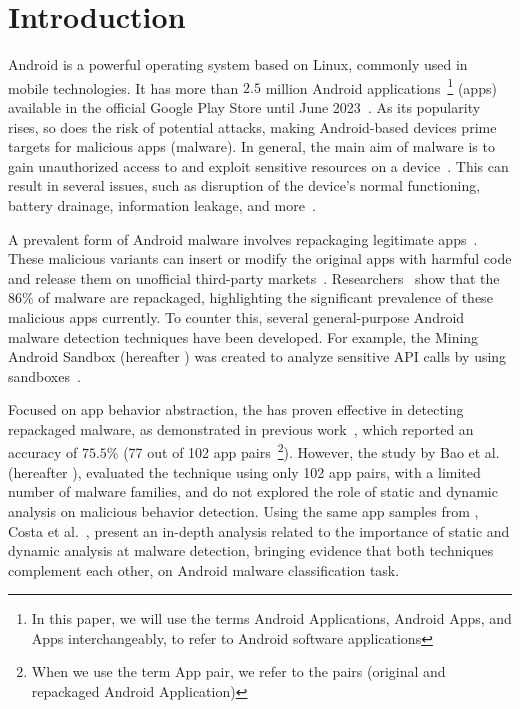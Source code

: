 \section{Introduction}\label{sec:introduction}

Android is a powerful operating system based on Linux, commonly used in mobile technologies. It has more than $2.5$ million Android applications~\footnote{In this paper, we will use the terms Android Applications, Android Apps, and Apps interchangeably, to refer to Android software applications} (apps) available in the official Google Play Store until June 2023~\cite{Statista}. As its popularity rises, so does the risk of potential attacks, making Android-based devices prime targets for malicious apps (malware). In general, the main aim of malware is to gain unauthorized access to and exploit sensitive resources on a device~\cite{DBLP:conf/ccs/FeltFCHW11,DBLP:journals/eswa/SurendranTE20}. This can result in several issues, such as disruption of the device's normal functioning, battery drainage, information leakage, and more~\cite{DBLP:conf/ccs/FeltFCHW11,DBLP:conf/sp/ZhouJ12}.

A prevalent form of Android malware involves repackaging legitimate apps~\cite{DBLP:conf/wcre/BaoLL18, le2018towards}. These malicious variants can insert or modify the original apps with harmful code and release them on unofficial third-party markets~\cite{DBLP:journals/tdsc/TianYRTP20}. Researchers~\cite{DBLP:journals/tdsc/TianYRTP20,DBLP:conf/sp/ZhouJ12,DBLP:journals/compsec/MerloRSV21} show that the $86\%$ of malware are repackaged, highlighting the significant prevalence of these malicious apps currently. To counter this, several general-purpose Android malware detection techniques have been developed. For example, the Mining Android Sandbox (hereafter \mas) was created to analyze sensitive API calls by using sandboxes~\cite{DBLP:conf/icse/JamrozikSZ16}. 

Focused on app behavior abstraction, the \mas has proven effective in detecting repackaged malware, as demonstrated in previous work~\cite{DBLP:conf/wcre/BaoLL18}, which reported an accuracy of $75.5\%$ (77 out of 102 app pairs~\footnote{When we use the term App pair, we refer to the pairs (original and repackaged Android Application)}). However, the study by Bao et al.~\cite{DBLP:conf/wcre/BaoLL18} (hereafter \blls), evaluated the technique using only 102 app pairs, with a limited number of malware families, and do not explored the role of static and dynamic analysis on malicious behavior detection. Using the same app samples from \blls, Costa et al.~\cite{DBLP:jourals/jjc/Handrick22}, present an in-depth analysis related to the importance of static and dynamic analysis at malware detection, bringing evidence that both techniques complement each other, on Android malware classification task. 

